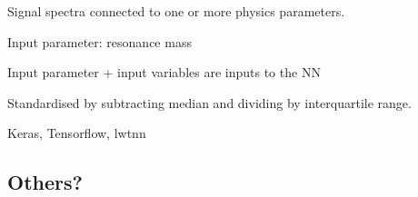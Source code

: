 Signal spectra connected to one or more physics parameters.

Input parameter: resonance mass \mX

Input parameter + input variables are inputs to the NN

Standardised by subtracting median and dividing by interquartile range.

Keras, Tensorflow, lwtnn






\subsection{Others?}



